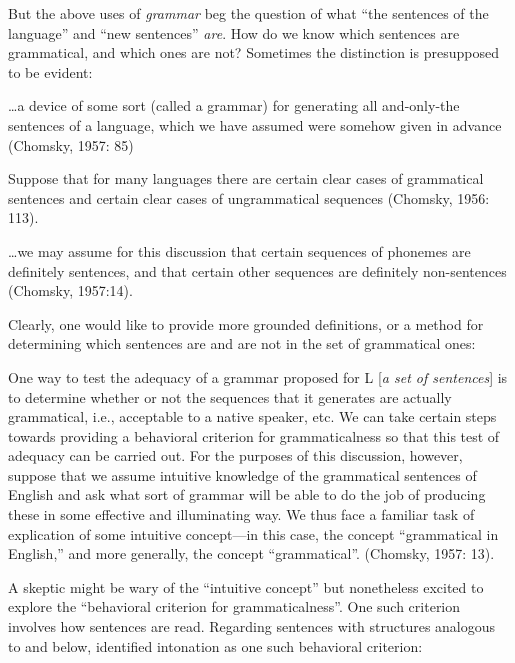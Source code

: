   But the above uses of \textit{grammar} beg the question of what “the sentences of the language” and “new sentences” \textit{are}. How do we know which sentences are grammatical, and which ones are not? Sometimes the distinction is presupposed to be evident:

…a device of some sort (called a grammar) for generating all and-only-the sentences of a language, which we have assumed were somehow given in advance (Chomsky, 1957: 85)

Suppose that for many languages there are certain clear cases of grammatical sentences and certain clear cases of ungrammatical sequences (Chomsky, 1956: 113).

…we may assume for this discussion that certain sequences of phonemes are definitely sentences, and that certain other sequences are definitely non-sentences (Chomsky, 1957:14).

Clearly, one would like to provide more grounded definitions, or a method for determining which sentences are and are not in the set of grammatical ones:

One way to test the adequacy of a grammar proposed for L [\textit{a set of sentences}] is to determine whether or not the sequences that it generates are actually grammatical, i.e., acceptable to a native speaker, etc. We can take certain steps towards providing a behavioral criterion for grammaticalness so that this test of adequacy can be carried out. For the purposes of this discussion, however, suppose that we assume intuitive knowledge of the grammatical sentences of English and ask what sort of grammar will be able to do the job of producing these in some effective and illuminating way. We thus face a familiar task of explication of some intuitive concept—in this case, the concept “grammatical in English,” and more generally, the concept “grammatical”. (Chomsky, 1957: 13).

  A skeptic might be wary of the “intuitive concept” but nonetheless excited to explore the “behavioral criterion for grammaticalness”. One such criterion involves how sentences are read. Regarding sentences with structures analogous to  and  below, \citet{Chomsky1956} identified intonation as one such behavioral criterion:



\ea%
    \label{ex:key:1}
    \gll\\
        \\
    \glt
    \z

